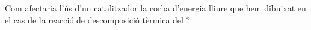 \begin{exr}{}
Com afectaria l'ús d'un catalitzador la corba d'energia lliure que hem dibuixat en el cas de la reacció de descomposició tèrmica del ?
\end{exr}
